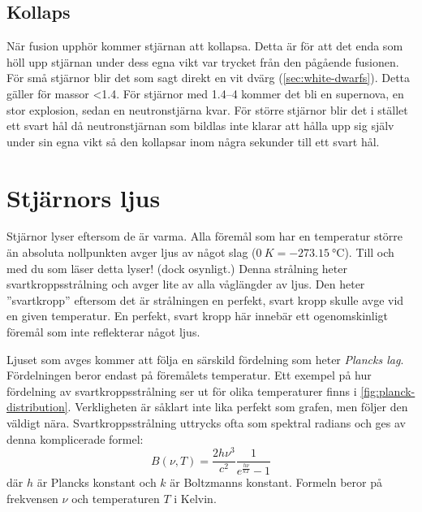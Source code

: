 \subsection{Kollaps}
När fusion upphör kommer stjärnan att kollapsa. Detta är för att det enda som höll upp stjärnan under dess egna vikt var trycket från den pågående fusionen. För små stjärnor blir det som sagt direkt en vit dvärg (\vref{sec:white-dwarfs}). Detta gäller för massor \qty{<1.4}{\Mo}. För stjärnor med \qtyrange{1.4}{4}{\Mo} kommer det bli en supernova, en stor explosion, sedan en neutronstjärna kvar. För större stjärnor blir det i stället ett svart hål då neutronstjärnan som bildlas inte klarar att hålla upp sig själv under sin egna vikt så den kollapsar inom några sekunder till ett svart hål.


\section{Stjärnors ljus}
Stjärnor lyser eftersom de är varma. Alla föremål som har en temperatur större än absoluta nollpunkten avger ljus av något slag ($\qty{0}{K} = \qty{-273.15}{\degreeCelsius}$). Till och med du som läser detta lyser! (dock osynligt.) Denna strålning heter svartkroppsstrålning och avger lite av alla våglängder av ljus. Den heter ''svartkropp'' eftersom det är strålningen en perfekt, svart kropp skulle avge vid en given temperatur. En perfekt, svart kropp här innebär ett ogenomskinligt föremål som inte reflekterar något ljus.

Ljuset som avges kommer att följa en särskild fördelning som heter \emph{Plancks lag}. Fördelningen beror endast på föremålets temperatur. Ett exempel på hur fördelning av svartkroppsstrålning ser ut för olika temperaturer finns i \cref{fig:planck-distribution}. Verkligheten är såklart inte lika perfekt som grafen, men följer den väldigt nära. Svartkroppsstrålning uttrycks ofta som spektral radians och ges av denna komplicerade formel:
\begin{equation}
    B(\nu, T) = \frac{2h\nu^3}{c^2} \frac{1}{e^{\frac{h\nu}{kT}} - 1}
    \label{eq:planck-distribution}
\end{equation}
där $h$ är Plancks konstant och $k$ är Boltzmanns konstant. Formeln beror på frekvensen $\nu$ och temperaturen $T$ i Kelvin.

